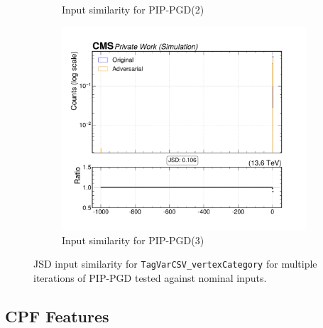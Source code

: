 \begin{figure}[htbp]
\begin{subfigure}[t]{0.32\textwidth}
    \caption*{Input similarity for PIP-PGD(2)}
  \end{subfigure}\hfill
  \begin{subfigure}[t]{0.32\textwidth}
    \includegraphics[width=\linewidth]{media/output/features/compare/combined_it_3/cmp_global_features_TagVarCSV_vertexCategory.pdf}
    \caption*{Input similarity for PIP-PGD(3)}
  \end{subfigure}

  \caption*{JSD input similarity for \texttt{TagVarCSV\_vertexCategory} for multiple iterations of PIP-PGD tested against nominal inputs.}
  \label{fig:combined_input_TagVarCSV_vertexCategory}
\end{figure}

\newpage
\subsection*{CPF Features}



